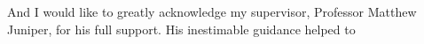 
\begin{acknowledgements}      


And I would like to greatly acknowledge my supervisor, Professor Matthew Juniper, for his full support. His inestimable guidance helped to 


\end{acknowledgements}
